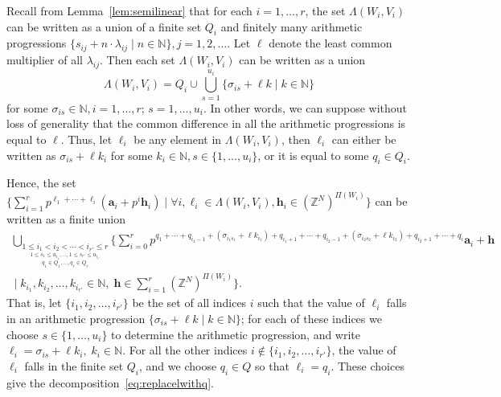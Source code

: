 \documentclass[letterpaper, 11pt, thm-restate]{article}
\numberwithin{equation}{section}
\newcommand{\Z}{\mathbb{Z}}
\newcommand{\N}{\mathbb{N}}
\newcommand{\ba}{\boldsymbol{a}}
\newcommand{\bh}{\boldsymbol{h}}
\theoremstyle{definition}
\theoremstyle{definition}
\theoremstyle{definition}
\begin{document}
Recall from Lemma~\ref{lem:semilinear} that for each $i = 1, \ldots, r$, the set $\Lambda(W_i, V_i)$ can be written as a union of a finite set $Q_i$ and finitely many arithmetic progressions $\{s_{ij} + n \cdot \lambda_{ij} \mid n \in \N\}, j = 1, 2, \ldots$.
Let $\ell$ denote the least common multiplier of all $\lambda_{ij}$.
Then each set $\Lambda(W_i, V_i)$ can be written as a union
\[
\Lambda(W_i, V_i) = Q_i \cup \bigcup_{s = 1}^{u_i} \{\sigma_{is} + \ell k \mid k \in \N\}
\]
for some $\sigma_{is} \in \N, i = 1, \ldots, r;\, s = 1, \ldots, u_i$.
In other words, we can suppose without loss of generality that the common difference in all the arithmetic progressions is equal to $\ell$.
Thus, let $\ell_i$ be any element in $\Lambda(W_i, V_i)$, then $\ell_i$ can either be written as $\sigma_{is} + \ell k_i$ for some $k_i \in \N, s \in \{1, \ldots, u_i\}$, or it is equal to some $q_i \in Q_i$.

Hence, the set $\Big\{\sum_{i = 1}^r p^{\ell_1 + \cdots + \ell_{i}} \left(\ba_i + p^i \bh_i\right) \;\Big|\; \forall i, \ell_i \in \Lambda(W_i, V_i), \bh_i \in (\Z^N)^{\Pi(W_i)} \Big\}$
can be written as a finite union
\begin{multline}\label{eq:replacelwithq}
\bigcup_{\underset{q_1 \in Q_1, \ldots, q_r \in Q_r}{\underset{1 \leq s_1 \leq u_{i_1}, \ldots, 1 \leq s_{r'} \leq u_{i_{r'}}}{1 \leq i_1 < i_2 < \cdots < i_{r'} \leq r}}}
\Bigg\{\sum_{i = 0}^{r} p^{q_1 + \cdots + q_{i_1 - 1} + (\sigma_{i_1s_1} + \ell k_{i_1}) + q_{i_1 + 1} + \cdots + q_{i_2 - 1} + (\sigma_{i_2s_2} + \ell k_{i_2}) + q_{i_2 + 1} + \cdots + q_i} \ba_i + \bh \\
\;\Bigg|\; k_{i_1}, k_{i_2}, \ldots, k_{i_{r'}} \in \N, \; \bh \in \sum_{i = 1}^r (\Z^N)^{\Pi(W_i)} \Bigg\}.
\end{multline}
That is, let $\{i_1, i_2, \ldots, i_{r'}\}$ be the set of all indices $i$ such that the value of $\ell_{i}$ falls in an arithmetic progression $\{\sigma_{is} + \ell k \mid k \in \N\}$; for each of these indices we choose $s \in \{1, \ldots, u_i\}$ to determine the arithmetic progression, and write $\ell_i = \sigma_{is} + \ell k_i,\; k_i \in \N$.
For all the other indices $i \notin \{i_1, i_2, \ldots, i_{r'}\}$, the value of $\ell_i$ falls in the finite set $Q_i$, and we choose $q_i \in Q$ so that $\ell_i = q_i$.
These choices give the decomposition~\eqref{eq:replacelwithq}.
\end{document}
